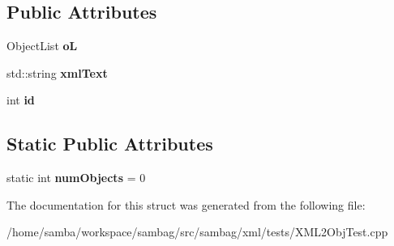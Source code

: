 \subsection*{Public Attributes}
\begin{DoxyCompactItemize}
\item 
\hypertarget{struct_base_object_aaeb58511262f4868b73198c20199d4b9}{
ObjectList {\bfseries oL}}
\label{struct_base_object_aaeb58511262f4868b73198c20199d4b9}

\item 
\hypertarget{struct_base_object_a00f7f647ca9a0583d2b11fc9fb278540}{
std::string {\bfseries xmlText}}
\label{struct_base_object_a00f7f647ca9a0583d2b11fc9fb278540}

\item 
\hypertarget{struct_base_object_ab21889ef86ffc1849898d2613ccdc75f}{
int {\bfseries id}}
\label{struct_base_object_ab21889ef86ffc1849898d2613ccdc75f}

\end{DoxyCompactItemize}
\subsection*{Static Public Attributes}
\begin{DoxyCompactItemize}
\item 
\hypertarget{struct_base_object_a82e3c8af21d913af997dda53a2e9c0af}{
static int {\bfseries numObjects} = 0}
\label{struct_base_object_a82e3c8af21d913af997dda53a2e9c0af}

\end{DoxyCompactItemize}


The documentation for this struct was generated from the following file:\begin{DoxyCompactItemize}
\item 
/home/samba/workspace/sambag/src/sambag/xml/tests/XML2ObjTest.cpp\end{DoxyCompactItemize}
